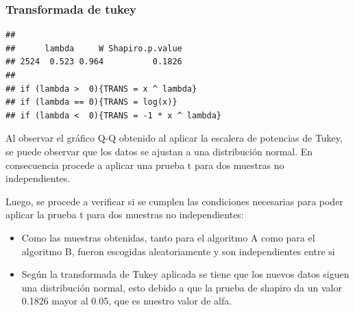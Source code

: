 \documentclass[
]{article}
\newenvironment{Shaded}{\begin{snugshade}}{\end{snugshade}}
\newcommand{\ConstantTok}[1]{\textcolor[rgb]{0.00,0.00,0.00}{#1}}
\newcommand{\DecValTok}[1]{\textcolor[rgb]{0.00,0.00,0.81}{#1}}
\newcommand{\FloatTok}[1]{\textcolor[rgb]{0.00,0.00,0.81}{#1}}
\newcommand{\FunctionTok}[1]{\textcolor[rgb]{0.00,0.00,0.00}{#1}}
\newcommand{\NormalTok}[1]{#1}
\newcommand{\OtherTok}[1]{\textcolor[rgb]{0.56,0.35,0.01}{#1}}
\newcommand{\SpecialCharTok}[1]{\textcolor[rgb]{0.00,0.00,0.00}{#1}}
\providecommand{\tightlist}{%
  \setlength{\itemsep}{0pt}\setlength{\parskip}{0pt}}
\begin{document}
\hypertarget{transformada-de-tukey}{%
\subsubsection{Transformada de tukey}\label{transformada-de-tukey}}

\begin{Shaded}
\end{Shaded}

\begin{verbatim}
## 
##      lambda     W Shapiro.p.value
## 2524  0.523 0.964          0.1826
## 
## if (lambda >  0){TRANS = x ^ lambda} 
## if (lambda == 0){TRANS = log(x)} 
## if (lambda <  0){TRANS = -1 * x ^ lambda}
\end{verbatim}

Al observar el gráfico Q-Q obtenido al aplicar la escalera de potencias
de Tukey, se puede observar que los datos se ajustan a una distribución
normal. En consecuencia procede a aplicar una prueba t para dos muestras
no independientes.

Luego, se procede a verificar si se cumplen las condiciones necesarias
para poder aplicar la prueba t para dos muestras no independientes:

\begin{itemize}
\tightlist
\item
  Como las muestras obtenidas, tanto para el algoritmo A como para el
  algoritmo B, fueron escogidas aleatoriamente y son independientes
  entre si
\item
  Según la transformada de Tukey aplicada se tiene que los nuevos datos
  siguen una distribución normal, esto debido a que la prueba de shapiro
  da un valor 0.1826 mayor al 0.05, que es nuestro valor de alfa.
\end{itemize}
\end{document}
